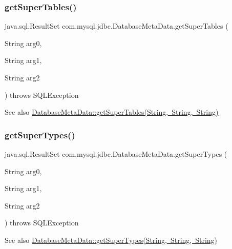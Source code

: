 \subsubsection{\texorpdfstring{get\+Super\+Tables()}{getSuperTables()}}
{\footnotesize\ttfamily java.\+sql.\+Result\+Set com.\+mysql.\+jdbc.\+Database\+Meta\+Data.\+get\+Super\+Tables (\begin{DoxyParamCaption}\item[{String}]{arg0,  }\item[{String}]{arg1,  }\item[{String}]{arg2 }\end{DoxyParamCaption}) throws S\+Q\+L\+Exception}

\begin{DoxySeeAlso}{See also}
\mbox{\hyperlink{classcom_1_1mysql_1_1jdbc_1_1_database_meta_data_a0292d35306f16ab85d756fc7f3c0a3c7}{Database\+Meta\+Data\+::get\+Super\+Tables(\+String, String, String)}} 
\end{DoxySeeAlso}
\mbox{\label{classcom_1_1mysql_1_1jdbc_1_1_database_meta_data_a44ea6c2a310bc34d7d679300eaca119d}} 
\subsubsection{\texorpdfstring{get\+Super\+Types()}{getSuperTypes()}}
{\footnotesize\ttfamily java.\+sql.\+Result\+Set com.\+mysql.\+jdbc.\+Database\+Meta\+Data.\+get\+Super\+Types (\begin{DoxyParamCaption}\item[{String}]{arg0,  }\item[{String}]{arg1,  }\item[{String}]{arg2 }\end{DoxyParamCaption}) throws S\+Q\+L\+Exception}

\begin{DoxySeeAlso}{See also}
\mbox{\hyperlink{classcom_1_1mysql_1_1jdbc_1_1_database_meta_data_a44ea6c2a310bc34d7d679300eaca119d}{Database\+Meta\+Data\+::get\+Super\+Types(\+String, String, String)}} 
\end{DoxySeeAlso}
\mbox{\label{classcom_1_1mysql_1_1jdbc_1_1_database_meta_data_adf3f45276eb77e47c9f96be148d310ec}} 
